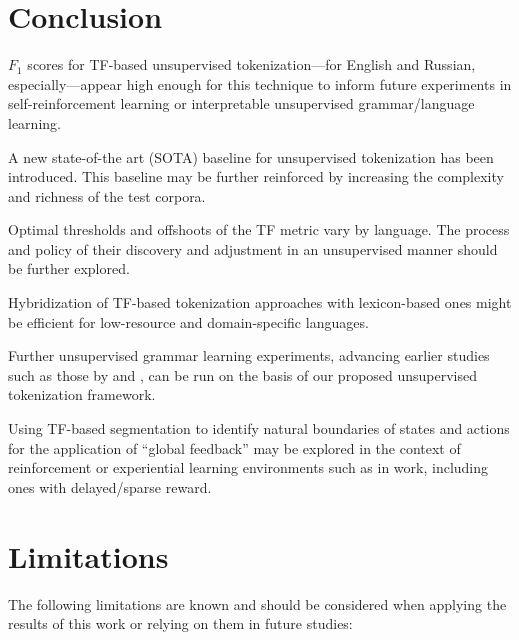 \documentclass[11pt]{article}
\begin{document}
\section{Conclusion}

$F_1$ scores for TF-based unsupervised tokenization—for English and Russian, especially—appear high enough for this technique to inform future experiments in self-reinforcement learning or interpretable unsupervised grammar/language learning.

A new state-of-the art (SOTA) baseline for unsupervised tokenization has been introduced. This baseline may be further reinforced by increasing the complexity and richness of the test corpora.

Optimal thresholds and offshoots of the TF metric vary by language. The process and policy of their discovery and adjustment in an unsupervised manner should be further explored.

Hybridization of TF-based tokenization approaches with lexicon-based ones might be efficient for low-resource and domain-specific languages.

Further unsupervised grammar learning experiments, advancing earlier studies such as those by \citet{5} and \citet{6}, can be run on the basis of our proposed unsupervised tokenization framework. 

Using TF-based segmentation to identify natural boundaries of states and actions for the application of “global feedback” may be explored in the context of reinforcement or experiential learning environments such as in  work, including ones with delayed/sparse reward.

\section*{Limitations}

The following limitations are known and should be considered when applying the results of this work or relying on them in future studies:
\end{document}
